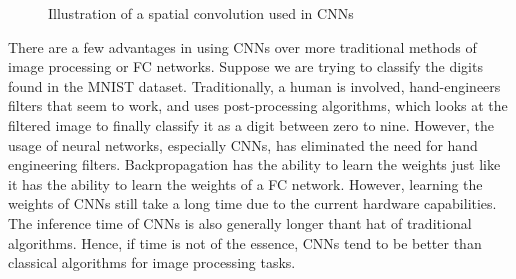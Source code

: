 \begin{figure}[!ht]
	\caption{Illustration of a spatial convolution used in CNNs}\label{fig:convolution}  
\end{figure}
There are a few advantages in using CNNs over more traditional methods of image processing or FC networks. Suppose we are trying to classify the digits found in the MNIST dataset. Traditionally, a human is involved, hand-engineers filters that seem to work, and uses post-processing algorithms, which looks at the filtered image to finally classify it as a digit between zero to nine. However, the usage of neural networks, especially CNNs, has eliminated the need for hand engineering filters. Backpropagation has the ability to learn the weights just like it has the ability to learn the weights of a FC network. However, learning the weights of CNNs still take a long time due to the current hardware capabilities. The inference time of CNNs is also generally longer thant hat of traditional algorithms. Hence, if time is not of the essence, CNNs tend to be better than classical algorithms for image processing tasks.

